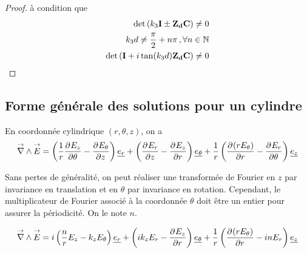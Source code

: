 \begin{proof}
    à condition que 
    \begin{align}
        \det\left(k_3\mI \pm \mat{Z_d}\mC \right) \not = 0 \\
        k_3d\not = \frac{\pi}{2}+n\pi\,, \forall n \in \NN \\
        \det\left(\mI + i\tan(k_3d)\mat{Z_d}\mC\right) \not = 0
    \end{align}




\end{proof}







\subsection{Forme générale des solutions pour un cylindre}

\newcommand{\mr}{r}
\newcommand{\mt}{\theta}
\newcommand{\mz}{z}

\begin{figure}[!htb]
    \centering
    \begin{tikzpicture}
        
    \end{tikzpicture}
\end{figure}



En coordonnée cylindrique $(r,\theta,z)$, on a
\begin{equation}
    \vrot \vE = \left(\frac{1}{r}\ddr{\theta}{E_z} - \ddr{z}{E_\theta}\right)\v{e_r} + 
    \left(\ddr{z}{E_r} - \ddr{r}{E_z}\right)\v{e_\theta} +
    \frac{1}{r}\left(\ddr{r}{(rE_\theta)}-\ddr{\theta}{E_r}\right)\v{e_z}
\end{equation}

Sans pertes de généralité, on peut réaliser une transformée de Fourier en $z$ par invariance en translation et en $\theta$ par invariance en rotation. Cependant, le multiplicateur de Fourier associé à la coordonnée $\theta$ doit être un entier pour assurer la périodicité. On le note $n$.

\begin{equation}
    \vrot \vE = i\left(\frac{n}{r}E_z - k_zE_\theta\right)\v{e_r} + 
    \left(ik_zE_r - \ddr{r}{E_z}\right)\v{e_\theta} +
    \frac{1}{r}\left(\ddr{r}{(rE_\theta)}-inE_r\right)\v{e_z}
\end{equation}

